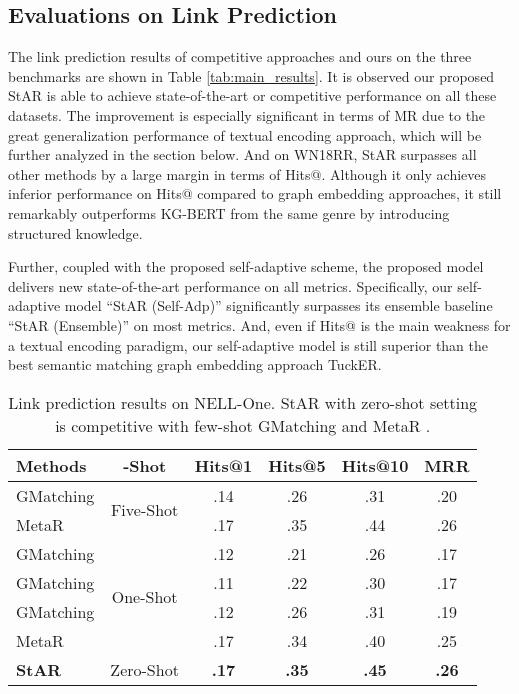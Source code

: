 \documentclass[sigconf]{acmart}
\begin{document}
\subsection{Evaluations on Link Prediction} \label{subsec:main_evaluation}

The link prediction results of competitive approaches and ours on the three benchmarks are shown in Table \ref{tab:main_results}. It is observed our proposed StAR is able to achieve state-of-the-art or competitive performance on all these datasets. The improvement is especially significant in terms of MR due to the great generalization performance of textual encoding approach, which will be further analyzed in the section below. 
And on WN18RR, StAR surpasses all other methods by a large margin in terms of Hits@. 
Although it only achieves inferior performance on Hits@ compared to graph embedding approaches, it still remarkably outperforms KG-BERT from the same genre by introducing structured knowledge. 

Further, coupled with the proposed self-adaptive scheme, the proposed model delivers new state-of-the-art performance on all metrics. 
Specifically, our self-adaptive model ``StAR (Self-Adp)'' significantly surpasses its ensemble baseline ``StAR (Ensemble)'' on most metrics. And, even if Hits@ is the main weakness for a textual encoding paradigm, our self-adaptive model is still superior than the best semantic matching graph embedding approach TuckER. 



\begin{table}[t] \small
\caption{\small Link prediction results on NELL-One. StAR with zero-shot setting is competitive with few-shot GMatching \cite{one-shot} and MetaR \cite{few-shot}.
	} 
    \setlength{\tabcolsep}{1pt}
	\centering
	\begin{tabular}{l|c|cccc}
		\hline
		\textbf{Methods}&  \textbf{-Shot}  &\textbf{Hits@1}   & \textbf{Hits@5}    & \textbf{Hits@10}   &\textbf{MRR} \\ \hline
		GMatching  &\multirow{2}{*}{Five-Shot} &.14 &.26 &.31 &.20 \\
		MetaR  & ~ &.17 &.35 &.44 &.26 \\ \hline
 		GMatching &\multirow{4}{*}{One-Shot} &.12 &.21 &.26 &.17 \\
		GMatching & ~ &.11 &.22 &.30 &.17 \\
		GMatching & ~ &.12 &.26 &.31 &.19 \\
		MetaR  & ~ &.17 &.34 &.40 &.25 \\ \hline
		\textbf{StAR} & Zero-Shot&\textbf{.17} &\textbf{.35} &\textbf{.45} &\textbf{.26} \\ \hline
		
	\end{tabular}
	\label{tb:generalization_rel}
\end{table}
\end{document}
